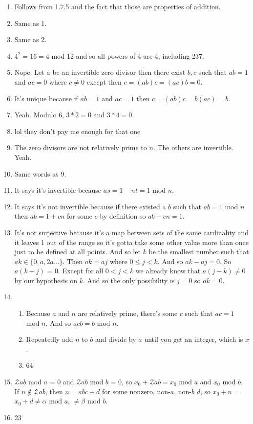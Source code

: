 \documentclass[11pt, oneside]{article}   	%
\newcommand{\ints}{\mathcal{Z}}
\newcommand{\be}{\begin{enumerate}}
\newcommand{\ee}{\end{enumerate}}
\begin{document}
\be
\item Follows from 1.7.5 and the fact that those are properties of addition.
\item Same as 1.
\item Same as 2.
\item $4^2 = 16 = 4$ mod 12 and so all powers of 4 are 4, including 237.
\item Nope. Let $a$ be an invertible zero divisor then there exist $b, c$ such that $ab = 1$ and $ac = 0$ where $c \not=0$ except then $c = (ab)c = (ac)b = 0$.
\item It's unique because if $ab = 1$ and $ac = 1$ then $c = (ab)c = b(ac) = b$.
\item Yeah. Modulo 6, $3*2 = 0$ and $3 * 4 = 0$. 
\item lol they don't pay me enough for that one
\item The zero divisors are not relatively prime to $n$. The others are invertible. Yeah.
\item Same words as 9.
\item It says it's invertible because $as = 1-nt = 1$ mod $n$.
\item It says it's not invertible because if there existed a $b$ such that $ab = 1$ mod $n$ then $ab = 1 + cn$ for some $c$ by definition so $ab - cn = 1$.
\item It's not surjective because it's a map between sets of the same cardinality and it leaves 1 out of the range so it's gotta take some other value more than once just to be defined at all points. And so let $k$ be the smallest number such that $ak \in \{0, a, 2a\ldots\}$. Then $ak = aj$ where $0 \le j < k$. And so $ak - aj = 0$. So $a(k-j)$ = 0. Except for all $0 < j < k$ we already know that $a(j-k) \not = 0$ by our hypothesis on $k$. And so the only possibility is $j=0$ so $ak = 0$. 
\item \be \item Because $a$ and $n$ are relatively prime, there's some $c$ such that $ac = 1$ mod $n$. And so $acb = b$ mod $n$.
\item Repeatedly add $n$ to $b$ and divide by $a$ until you get an integer, which is $x$.
\item 64
\ee 
\item $\ints ab$ mod $a$ = 0 and $\ints ab$ mod $b$ = 0, so $x_0 + \ints ab = x_0$ mod $a$ and $x_0$ mod $b$. If $n \not \in \ints ab$, then $n = abc + d$ for some nonzero, non-$a$, non-$b$ $d$, so $x_0 + n$ = $x_0 + d \not = \alpha$ mod $a$, $\not = \beta$ mod $b$.
\item 23
\ee
\end{document}
